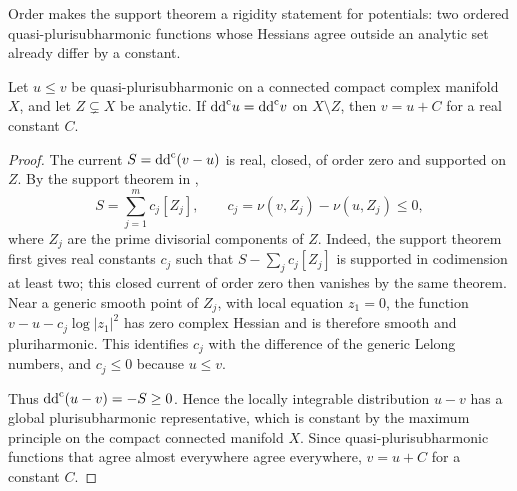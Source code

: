 Order makes the support theorem a rigidity statement for potentials: two ordered quasi-plurisubharmonic functions whose Hessians agree outside an analytic set already differ by a constant.

\begin{lemma}\label{lem:ordered-analytic-rigidity}
Let $u\leq v$ be quasi-plurisubharmonic on a connected compact complex manifold $X$, and let $Z\subsetneq X$ be analytic. If $\mathrm{dd}^{\mathrm{c}} u=\mathrm{dd}^{\mathrm{c}} v$ on $X\setminus Z$, then $v=u+C$ for a real constant $C$.
\end{lemma}
\begin{proof}
The current $S=\mathrm{dd}^{\mathrm{c}}(v-u)$ is real, closed, of order zero and supported on $Z$. By the support theorem in \cite[Chapter III, Corollaries 2.11 and 2.14, pp.~141--143]{DemCADG},
\begin{equation}\label{eq:semipositive-dual-divisorial-difference}
 S=\sum_{j=1}^m c_j[Z_j],\qquad
 c_j=\nu(v,Z_j)-\nu(u,Z_j)\leq0,
\end{equation}
where $Z_j$ are the prime divisorial components of $Z$. Indeed, the support theorem first gives real constants $c_j$ such that $S-\sum_jc_j[Z_j]$ is supported in codimension at least two; this closed current of order zero then vanishes by the same theorem. Near a generic smooth point of $Z_j$, with local equation $z_1=0$, the function $v-u-c_j\log|z_1|^2$ has zero complex Hessian and is therefore smooth and pluriharmonic. This identifies $c_j$ with the difference of the generic Lelong numbers, and $c_j\leq0$ because $u\leq v$.

Thus $\mathrm{dd}^{\mathrm{c}}(u-v)=-S\geq0$. Hence the locally integrable distribution $u-v$ has a global plurisubharmonic representative, which is constant by the maximum principle on the compact connected manifold $X$. Since quasi-plurisubharmonic functions that agree almost everywhere agree everywhere, $v=u+C$ for a constant $C$.
\end{proof}



